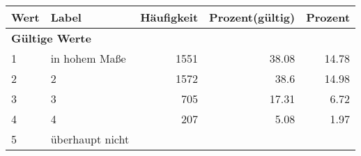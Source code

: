      \begin{longtable}{lXrrr}
     \toprule
     \textbf{Wert} & \textbf{Label} & \textbf{Häufigkeit} & \textbf{Prozent(gültig)} & \textbf{Prozent} \\
     \endhead
     \midrule
     \multicolumn{5}{l}{\textbf{Gültige Werte}}\\

     1 &
     \multicolumn{1}{X}{ in hohem Maße   } &


       \num{1551} &
       \num[round-mode=places,round-precision=2]{38,08} &
         \num[round-mode=places,round-precision=2]{14,78} \\

     2 &
     \multicolumn{1}{X}{ 2   } &


       \num{1572} &
       \num[round-mode=places,round-precision=2]{38,6} &
         \num[round-mode=places,round-precision=2]{14,98} \\

     3 &
     \multicolumn{1}{X}{ 3   } &


       \num{705} &
       \num[round-mode=places,round-precision=2]{17,31} &
         \num[round-mode=places,round-precision=2]{6,72} \\

     4 &
     \multicolumn{1}{X}{ 4   } &


       \num{207} &
       \num[round-mode=places,round-precision=2]{5,08} &
         \num[round-mode=places,round-precision=2]{1,97} \\

     5 &
     \multicolumn{1}{X}{ überhaupt nicht   } &



\end{longtable}
